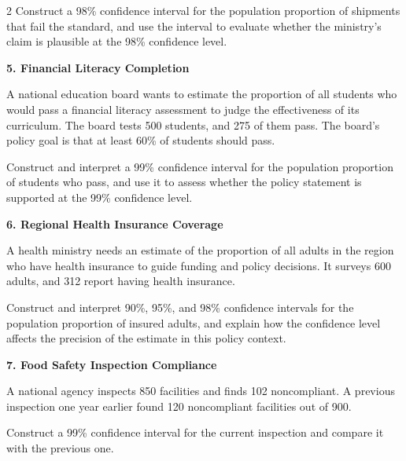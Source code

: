 \documentclass[12pt]{article}
\newcommand{\SubsectionBox}[1]{%
	\noindent\colorbox{gray!30}{%
		\parbox{\linewidth}{\textbf{#1}}%
	}\par\vspace{0.35cm}%
}
\begin{document}
\begin{multicols}{2}
		Construct a 98\% confidence interval for the population proportion of shipments that fail the standard, and use the interval to evaluate whether the ministry’s claim is plausible at the 98\% confidence level.
		
		\vspace{0.25cm}
		\SubsectionBox{5. Financial Literacy Completion}\vspace{-0.25cm}
		A national education board wants to estimate the proportion of all students who would pass a financial literacy assessment to judge the effectiveness of its curriculum. The board tests 500 students, and 275 of them pass. The board’s policy goal is that at least 60\% of students should pass.

		Construct and interpret a 99\% confidence interval for the population proportion of students who pass, and use it to assess whether the policy statement is supported at the 99\% confidence level.
	
		\vspace{0.25cm}
		\SubsectionBox{6. Regional Health Insurance Coverage}\vspace{-0.25cm}
		A health ministry needs an estimate of the proportion of all adults in the region who have health insurance to guide funding and policy decisions. It surveys 600 adults, and 312 report having health insurance.

		Construct and interpret 90\%, 95\%, and 98\% confidence intervals for the population proportion of insured adults, and explain how the confidence level affects the precision of the estimate in this policy context.
	
		\vspace{0.25cm}
		\SubsectionBox{7. Food Safety Inspection Compliance}\vspace{-0.25cm}
		A national agency inspects 850 facilities and finds 102 noncompliant. A previous inspection one year earlier found 120 noncompliant facilities out of 900.

		Construct a 99\% confidence interval for the current inspection and compare it with the previous one.

	\end{multicols}
\end{document}
